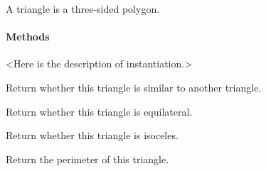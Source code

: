 \documentclass[letterpaper,10pt,english]{sphinxmanual}
\begin{document}
\begin{fulllineitems}
\label{\detokenize{api:trianglelib.shape.Triangle}}
A triangle is a three-sided polygon.
\paragraph{Methods}

\textless{}Here is the description of instantiation.\textgreater{}

\begin{fulllineitems}
\label{\detokenize{api:trianglelib.shape.Triangle.is_similar}}
Return whether this triangle is similar to another triangle.

\end{fulllineitems}


\begin{fulllineitems}
\label{\detokenize{api:trianglelib.shape.Triangle.is_equilateral}}
Return whether this triangle is equilateral.

\end{fulllineitems}


\begin{fulllineitems}
\label{\detokenize{api:trianglelib.shape.Triangle.is_isosceles}}
Return whether this triangle is isoceles.

\end{fulllineitems}


\begin{fulllineitems}
\label{\detokenize{api:trianglelib.shape.Triangle.perimeter}}
Return the perimeter of this triangle.

\end{fulllineitems}



\end{fulllineitems}
\end{document}
